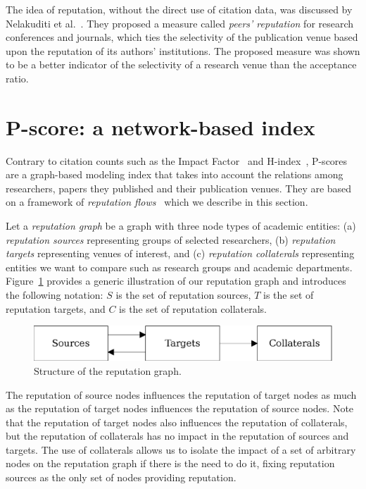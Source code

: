 \documentclass[notitlepage]{svjour3}
\begin{document}
The idea of reputation, without the direct use of citation data, was discussed by Nelakuditi et al.~\cite{Nelakuditi2011}. 
They proposed a measure called \textit{peers' reputation} for 
research conferences and journals, which ties the selectivity of the publication venue based upon 
the reputation of its authors' institutions. The proposed measure was shown to be a better indicator 
of the selectivity of a research venue than the acceptance ratio.

\section{P-score: a network-based index} 
\label{pscore} 

Contrary to citation counts such as the Impact 
Factor~\cite{Garfield1955a,Saha2003,Thomson2017,Balaban2012} and 
H-index~\cite{Benevenuto2016,Bar-Ilan2008,Egghe2008,Bornmann2005,Bornmann2011}, 
P-scores are a graph-based modeling index that takes into account 
the relations among researchers, papers they published and their publication venues. They are based on a framework of \textit{reputation flows}~\cite{Ribas2015} which we describe in this section.

Let a \emph{reputation graph} be a graph with three node types of academic entities: (a) {\em reputation sources} representing groups of selected researchers, 
(b) {\em reputation targets} representing venues of interest, and
(c) {\em reputation collaterals} representing entities we want to compare such as research groups and academic 
departments. 
Figure~\ref{fig:overview} provides a generic illustration of our reputation graph and introduces the following 
notation: $S$ is the set of reputation sources, $T$ is the set of reputation targets, and $C$ is the set of reputation collaterals.

\begin{figure}[ht]
   \centerline{\includegraphics[scale=0.6]{figures/overview-line}}
   \caption{Structure of the reputation graph.}
   \label{fig:overview}
\end{figure}

The reputation of source nodes influences the reputation
of target nodes as much as the reputation of target nodes
influences the reputation of source nodes. Note that the
reputation of target nodes also influences the reputation of
collaterals, but the reputation of collaterals has no impact
in the reputation of sources and targets. The use of collaterals
allows us to isolate the impact of a set of arbitrary
nodes on the reputation graph if there is the need to do it, 
fixing reputation sources as the only set of nodes providing reputation. 
\end{document}
